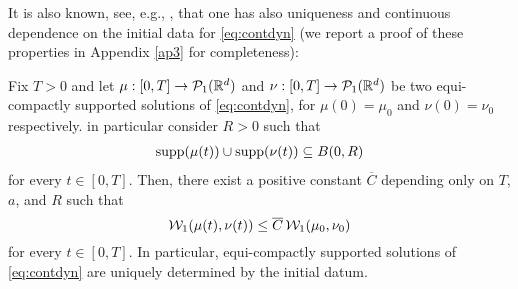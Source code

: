 It is also known, see, e.g., \cite{CanCarRos10}, that one has also uniqueness and continuous dependence on the initial data for \eqref{eq:contdyn} (we report a proof of these properties in Appendix \ref{ap3} for completeness):

\begin{theorem}\label{uniq}
Fix $T>0$  and let $\mu:[0,T]\rightarrow\mathcal{P}_1(\mathbb{R}^d)$ and $\nu:[0,T]\rightarrow\mathcal{P}_1(\mathbb{R}^d)$ be two equi-compactly supported solutions  of \eqref{eq:contdyn}, for $\mu(0)=\mu_0$ and $\nu(0)=\nu_0$ respectively. in particular consider $R>0$ such that
\begin{align}\label{supptot}
\operatorname{supp}(\mu(t))\cup\operatorname{supp}(\nu(t)) \subseteq B(0, R)
\end{align}
for every $t \in[0, T]$. Then, there exist a positive constant $\overline{C}$ depending only on $T$, $a$,  and $R$ such that
\begin{equation}\label{stab}
\mathcal{W}_1(\mu(t), \nu(t)) \le \overline{C} \, \mathcal{W}_1(\mu_0, \nu_0)
\end{equation}
for every $t \in [0, T]$. In particular, equi-compactly supported solutions of \eqref{eq:contdyn} are uniquely determined by the initial datum.
\end{theorem}
